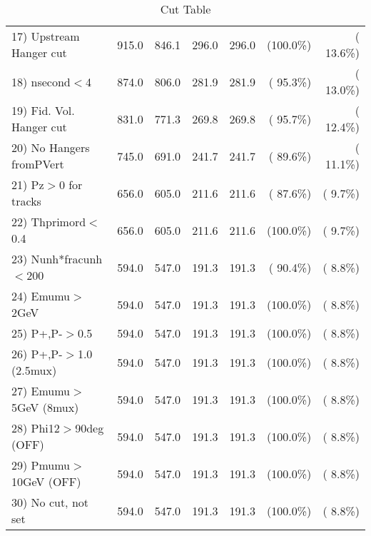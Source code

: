 \begin{table}[h!]
\begin{tabular}{||l||r|r|r|r|r|r||}
 17) Upstream Hanger cut  &        915.0 &        846.1 &        296.0 &        296.0 & (100.0\%) & ( 13.6\%) \\
 18) nsecond$<$4          &        874.0 &        806.0 &        281.9 &        281.9 & ( 95.3\%) & ( 13.0\%) \\
 19) Fid. Vol. Hanger cut &        831.0 &        771.3 &        269.8 &        269.8 & ( 95.7\%) & ( 12.4\%) \\
 20) No Hangers fromPVert &        745.0 &        691.0 &        241.7 &        241.7 & ( 89.6\%) & ( 11.1\%) \\
 21) Pz$>$0 for tracks    &        656.0 &        605.0 &        211.6 &        211.6 & ( 87.6\%) & (  9.7\%) \\
 22) Thprimord$<$0.4      &        656.0 &        605.0 &        211.6 &        211.6 & (100.0\%) & (  9.7\%) \\
 23) Nunh*fracunh$<$200   &        594.0 &        547.0 &        191.3 &        191.3 & ( 90.4\%) & (  8.8\%) \\
 24) Emumu$>$2GeV         &        594.0 &        547.0 &        191.3 &        191.3 & (100.0\%) & (  8.8\%) \\
 25) P+,P-$>$0.5          &        594.0 &        547.0 &        191.3 &        191.3 & (100.0\%) & (  8.8\%) \\
 26) P+,P-$>$1.0 (2.5mux) &        594.0 &        547.0 &        191.3 &        191.3 & (100.0\%) & (  8.8\%) \\
 27) Emumu$>$5GeV  (8mux) &        594.0 &        547.0 &        191.3 &        191.3 & (100.0\%) & (  8.8\%) \\
 28) Phi12$>$90deg  (OFF) &        594.0 &        547.0 &        191.3 &        191.3 & (100.0\%) & (  8.8\%) \\
 29) Pmumu$>$10GeV  (OFF) &        594.0 &        547.0 &        191.3 &        191.3 & (100.0\%) & (  8.8\%) \\
 30) No cut, not set      &        594.0 &        547.0 &        191.3 &        191.3 & (100.0\%) & (  8.8\%) \\
 \hline
 \hline
 \end{tabular}
 \caption{Cut Table           }
 \label{tab-cutcohjpsi-mumu_ccdis}
 \end{table}
